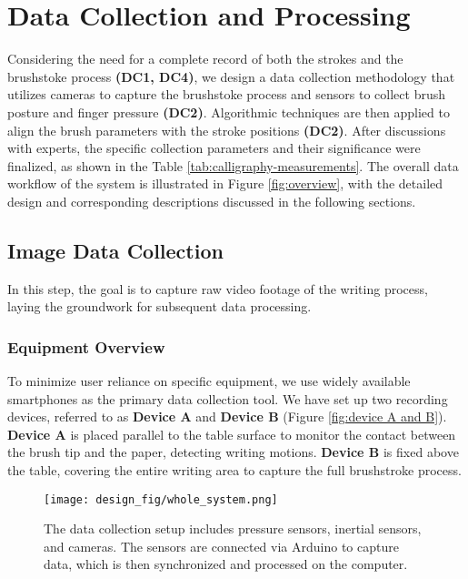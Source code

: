 \section{Data Collection and Processing}
Considering the need for a complete record of both the strokes and the brushstoke process \textbf{(DC1, DC4)}, we design a data collection methodology that utilizes cameras to capture the brushstoke process and sensors to collect brush posture and finger pressure \textbf{(DC2)}. Algorithmic techniques are then applied to align the brush parameters with the stroke positions \textbf{(DC2)}. After discussions with experts, the specific collection parameters and their significance were finalized, as shown in the Table \ref{tab:calligraphy-measurements}. The overall data workflow of the system is illustrated in Figure \ref{fig:overview}, with the detailed design and corresponding descriptions discussed in the following sections.

















\subsection{Image Data Collection}
In this step, the goal is to capture raw video footage of the writing process, laying the groundwork for subsequent data processing. 
\subsubsection{Equipment Overview}
To minimize user reliance on specific equipment, we use widely available smartphones as the primary data collection tool. We have set up two recording devices, referred to as \textbf{Device A} and \textbf{Device B} (Figure \ref{fig:device A and B}). \textbf{Device A} is placed parallel to the table surface to monitor the contact between the brush tip and the paper, detecting writing motions. \textbf{Device B} is fixed above the table, covering the entire writing area to capture the full brushstroke process.

\begin{figure}[t!]
    \centering
    \texttt{[image: design\_fig/whole\_system.png]}
    \caption{The data collection setup includes pressure sensors, inertial sensors, and cameras. The sensors are connected via Arduino to capture data, which is then synchronized and processed on the computer.}
    \label{fig:whole system}
\end{figure}

